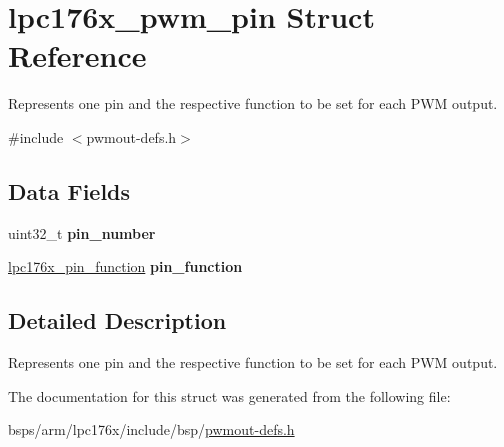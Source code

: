 \hypertarget{structlpc176x__pwm__pin}{}\section{lpc176x\+\_\+pwm\+\_\+pin Struct Reference}
\label{structlpc176x__pwm__pin}


Represents one pin and the respective function to be set for each P\+WM output.  




{\ttfamily \#include $<$pwmout-\/defs.\+h$>$}

\subsection*{Data Fields}
\begin{DoxyCompactItemize}
\item 
\mbox{\label{structlpc176x__pwm__pin_a070170437e2ea0bdac5db2e15bcec598}} 
uint32\+\_\+t {\bfseries pin\+\_\+number}
\item 
\mbox{\label{structlpc176x__pwm__pin_ab7c9998f8f6b7dfcd8e686ce94494720}} 
\mbox{\hyperlink{io-defs_8h_a93321e597449441e81f45118a89a304e}{lpc176x\+\_\+pin\+\_\+function}} {\bfseries pin\+\_\+function}
\end{DoxyCompactItemize}


\subsection{Detailed Description}
Represents one pin and the respective function to be set for each P\+WM output. 

The documentation for this struct was generated from the following file\+:\begin{DoxyCompactItemize}
\item 
bsps/arm/lpc176x/include/bsp/\mbox{\hyperlink{pwmout-defs_8h}{pwmout-\/defs.\+h}}\end{DoxyCompactItemize}
